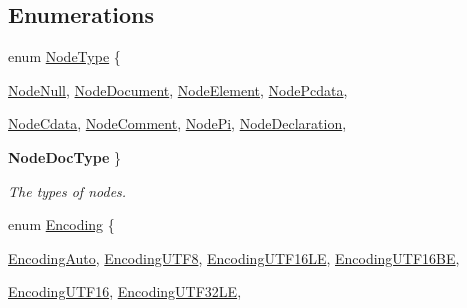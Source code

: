 \subsection*{Enumerations}
\begin{DoxyCompactItemize}
\item 
enum \hyperlink{namespacephys_1_1xml_a668b0cc666a9d49f7c7222a7552115d3}{NodeType} \{ \par
\hyperlink{namespacephys_1_1xml_a668b0cc666a9d49f7c7222a7552115d3af6e95d4a0b6115c76b339961bc58d742}{NodeNull}, 
\hyperlink{namespacephys_1_1xml_a668b0cc666a9d49f7c7222a7552115d3acfe92e6bd275972917b95f08bd46e09f}{NodeDocument}, 
\hyperlink{namespacephys_1_1xml_a668b0cc666a9d49f7c7222a7552115d3a92facb9678134df6404ce63e7e48624c}{NodeElement}, 
\hyperlink{namespacephys_1_1xml_a668b0cc666a9d49f7c7222a7552115d3ab48d4b88d7a7757e3e8505c90db3b2bf}{NodePcdata}, 
\par
\hyperlink{namespacephys_1_1xml_a668b0cc666a9d49f7c7222a7552115d3a353968e806a751a6da4f7ac115b4ab55}{NodeCdata}, 
\hyperlink{namespacephys_1_1xml_a668b0cc666a9d49f7c7222a7552115d3a25b778cb61ae0a9f15590cad5e0120d2}{NodeComment}, 
\hyperlink{namespacephys_1_1xml_a668b0cc666a9d49f7c7222a7552115d3a3c09d11be0cea840f23f55e084cf72fa}{NodePi}, 
\hyperlink{namespacephys_1_1xml_a668b0cc666a9d49f7c7222a7552115d3a1e3789aa995b7bf563ca8c43553ac035}{NodeDeclaration}, 
\par
{\bfseries NodeDocType}
 \}
\begin{DoxyCompactList}\small\item\em The types of nodes. \item\end{DoxyCompactList}\item 
enum \hyperlink{namespacephys_1_1xml_a420f5de782438f88160321385bea2015}{Encoding} \{ \par
\hyperlink{namespacephys_1_1xml_a420f5de782438f88160321385bea2015a2792ef334e1061e7ad177df463256d85}{EncodingAuto}, 
\hyperlink{namespacephys_1_1xml_a420f5de782438f88160321385bea2015a7793b4cde174342c9450abbeab675743}{EncodingUTF8}, 
\hyperlink{namespacephys_1_1xml_a420f5de782438f88160321385bea2015aa5e6a756e80683f376d1ef0a03b21d56}{EncodingUTF16LE}, 
\hyperlink{namespacephys_1_1xml_a420f5de782438f88160321385bea2015a04fd7b1fef8d2dcc67a46b8fe4dbcaf4}{EncodingUTF16BE}, 
\par
\hyperlink{namespacephys_1_1xml_a420f5de782438f88160321385bea2015ac19070aaf7044426b0fe8fa5af956130}{EncodingUTF16}, 
\hyperlink{namespacephys_1_1xml_a420f5de782438f88160321385bea2015a127752883aaf8c9bdb5f66ec725211fc}{EncodingUTF32LE}, 

\end{DoxyCompactItemize}
